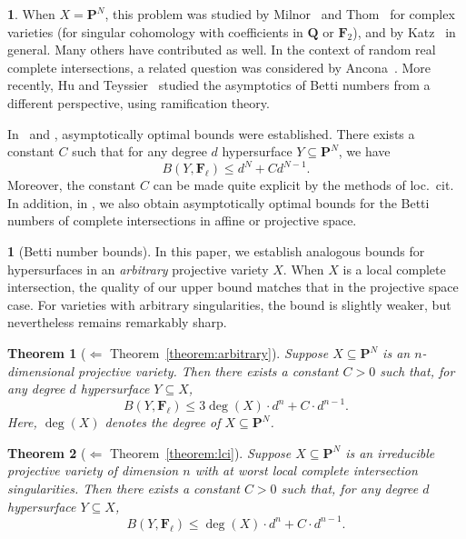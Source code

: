 \documentclass[english]{smfart}
\renewcommand{\mathbb}{\mathbf}
\renewcommand{\leq}{\leqslant}
\renewcommand{\subset}{\subseteq}
\theoremstyle{remark}
\theoremstyle{plain}
\newtheorem{theorem1}{Theorem}
\theoremstyle{definition}
\numberwithin{equation}{remark}
\theoremstyle{void}
\newtheorem{situation}[remark]{}
\begin{document}
\begin{situation}\label{situation:pn-case}
When \(X = \mathbb{P}^N\), this problem was studied by Milnor~\cite{milnor_betti} and
Thom~\cite{thom_homology-of-real-varieties} for complex varieties (for singular cohomology
with coefficients in \(\mathbb{Q}\) or \(\mathbb{F}_2\)), and by Katz~\cite{katz_betti} in general.  Many others have contributed as well.  In the context of random real
complete intersections, a related question was considered by Ancona~\cite{ancona_topology-random-real-ci}.
More recently, Hu and Teyssier~\cite{hu-teyssier_betti} studied the asymptotics of Betti numbers
from a different perspective, using ramification theory.

In~\cite{maxim-paunescu-tibar_vanishing-cohomology-hypersurfaces} and
\cite{wan-zhang_betti-number-bounds-for-varieties-and-exponential-sums0},
asymptotically optimal bounds were established.  There exists a
constant \(C\) such that for any degree \(d\) hypersurface
\(Y \subset \mathbb{P}^N\), we have
\[
B(Y,\mathbb{F}_{\ell}) \leq d^N + C d^{N-1}.
\]
Moreover, the constant \(C\) can be made quite explicit by the methods
of loc.\ cit. In addition, in
\cite{wan-zhang_betti-number-bounds-for-varieties-and-exponential-sums0},
we also obtain asymptotically optimal bounds for the Betti numbers of
complete intersections in affine or projective space.
\end{situation}

\begin{situation}[Betti number bounds]
In this paper, we establish analogous bounds for hypersurfaces in an
\emph{arbitrary} projective variety \(X\).  When \(X\) is a local
complete intersection, the quality of our upper bound matches that in
the projective space case.  For varieties with arbitrary
singularities, the bound is slightly weaker, but nevertheless remains
remarkably sharp.
\end{situation}

\begin{theorem1}[\(\Leftarrow\) Theorem~\ref{theorem:arbitrary}]
\label{theorem1}
Suppose \(X \subset \mathbb{P}^{N}\) is an \(n\)-dimensional
projective variety.  Then there exists a constant \(C > 0\) such that,
for any degree \(d\) hypersurface \(Y \subset X\),
\[
B(Y, \mathbb{F}_{\ell}) \leq 3 \deg(X) \cdot d^n + C\cdot d^{n-1}.
\]
Here, \(\deg(X)\) denotes the degree of \(X \subset \mathbb{P}^N\).
\end{theorem1}

\begin{theorem1}[\(\Leftarrow\) Theorem~\ref{theorem:lci}]
\label{theorem2}
Suppose \(X \subset \mathbb{P}^{N}\) is an irreducible projective
variety of dimension \(n\) with at worst \emph{local complete intersection}
singularities.  Then there exists a constant \(C > 0\) such that, for
any degree \(d\) hypersurface \(Y \subset X\),
\[
B(Y, \mathbb{F}_{\ell}) \leq \deg(X) \cdot d^n + C\cdot d^{n-1}.
\]
\end{theorem1}
\end{document}
